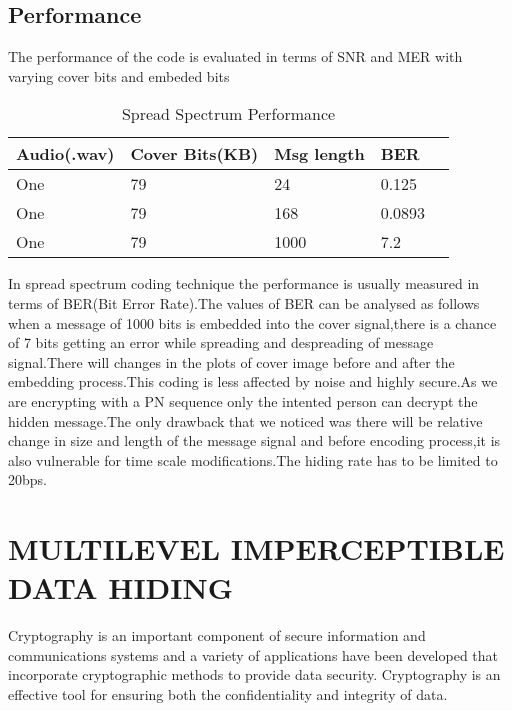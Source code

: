 \documentclass[a4paper, 12pt, notitlepage]{report}
\begin{document}
\section{Performance}

The performance of the code is evaluated in terms of SNR and MER with varying cover bits and embeded bits

\begin{table}[h]
\begin{tabular}{|l|l|l|l|l|}
\hline
\textbf{ Audio(.wav)}&\textbf{Cover Bits(KB)}&\textbf{Msg length}&\textbf{BER} \\ \hline
 One&79  &24  &0.125   \\ \hline
 One&79  &168  &0.0893  \\ \hline
 One&79  &1000  &7.2  \\ \hline
\end{tabular}
\caption{Spread Spectrum Performance}
\end{table}


In spread spectrum coding technique the performance is usually measured in terms of BER(Bit Error Rate).The values of BER can be analysed as follows when a message of 1000 bits is embedded into the cover signal,there is a chance of 7 bits getting an error while spreading and despreading of message signal.There will changes in the plots of cover image before and after the embedding process.This coding is less affected by noise and highly secure.As we are encrypting with a PN sequence only the intented person can decrypt the hidden message.The only drawback that we noticed was there will be relative change in size and length of the message signal and before encoding process,it is also vulnerable for time scale modifications.The hiding rate has to be limited to 20bps.\\

\chapter{MULTILEVEL IMPERCEPTIBLE DATA HIDING}

Cryptography is an important component of secure 
information and communications systems and a variety of 
applications have been developed that incorporate 
cryptographic methods to provide data security. 
Cryptography is an effective tool for ensuring both the 
confidentiality and integrity of data. \\
\end{document}
